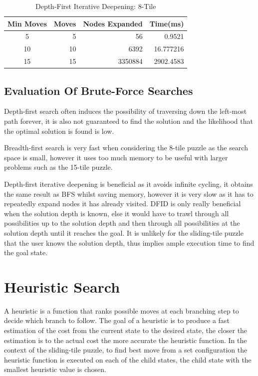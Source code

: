 \documentclass[final]{cmpreport}
\begin{document}
\begin{table}[ht]
	\caption{Depth-First Iterative Deepening: 8-Tile}
	\begin{center}
		\begin{tabular}{crrr} \hline
			Min Moves & Moves & Nodes Expanded &Time(ms)  \\ \hline
			5  & 5 & 56 & 0.9521 \\
			10 & 10  &6392&  16.777216 \\ 
			15 & 15 & 3350884& 2902.4583  \\ \hline
		
		\end{tabular}
	\end{center}
\end{table}



\subsection{Evaluation Of Brute-Force Searches}
Depth-first search often induces the possibility of traversing down the left-most path forever, it is also not guaranteed to find the solution and the likelihood that the optimal solution is found is low.

Breadth-first search is very fast when considering the 8-tile puzzle as the search space is small, however it uses too much memory to be useful with larger problems such as the 15-tile puzzle. 

Depth-first iterative deepening is beneficial as it avoids infinite cycling, it obtains the same result as BFS whilst saving memory, however it is very slow as it has to repeatedly expand nodes it has already visited. DFID is only really beneficial when the solution depth is known, else it would have to trawl through all possibilities up to the solution depth and then through all possibilities at the solution depth until it reaches the goal. It is unlikely for the sliding-tile puzzle that the user knows the solution depth, thus implies ample execution time to find the goal state.


\section{Heuristic Search} \label{sec1}
 A heuristic is a function that ranks possible moves at each branching step to decide which branch to follow. The goal of a heuristic is to produce a fast estimation of the cost from the current state to the desired state, the closer the estimation is to the actual cost the more accurate the heuristic function. In the context of the sliding-tile puzzle, to find best move from a set configuration the heuristic function is executed on each of the child states, the child state with the smallest heuristic value is chosen.
 
\end{document}
